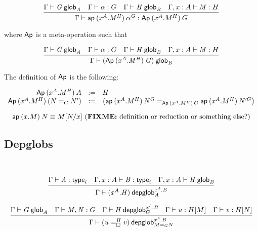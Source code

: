 \begin{small}
  \[\infer{\ofglob{\Gamma}{\ap{(x^A.M^H)}{\alpha^G}}
    {\Ap{(x^A.M^H)}{G}}}
  {\wfglob{\Gamma}{G}{n}{A}
    & \ofglob{\Gamma}{\alpha}{G}
    & \wfglob{\Gamma}{H}{m}{B}
    & \ofglob{\Gamma,x:A}{M}{H}}\]

  where $\dsd{Ap}$ is a meta-operation such that

  \[\infer{\wfglob{\Gamma}{(\Ap{(x^A.M^H)}{G})}{n+m}
    {B}}
  {\wfglob{\Gamma}{G}{n}{A}
    & \ofglob{\Gamma}{\alpha}{G}
    & \wfglob{\Gamma}{H}{m}{B}
    & \ofglob{\Gamma,x:A}{M}{H}}\]

  The definition of $\dsd{Ap}$ is the following:

  \[
  \begin{array}{rcl}
    \Ap{(x^A.M^H)}{A} & := & H \\
    \Ap{(x^A.M^H)}{(\homj{G}{N}{N'})} & := & \left(
      \homj{\Ap{(x^A.M^H)}{G}}
      {\ap{(x^A.M^H)}{N^G}}{\ap{(x^A.M^H)}{N'^G}}\right)
  \end{array}
  \]
\end{small}

\begin{small}
  \[
  \apn{0}{(x.M)}{N}  \equiv  \subst{M}{N}{x}
  \text{ (\FIXME{definition or reduction or something else?})} \\ \\
  \]
\end{small}



\subsection{Depglobs}

\\

\begin{small}
  \[\infer{\wfdepglob{\Gamma}{(x^A.H)}{0,m}{x^A.B}{A}}
  {\wftype{\Gamma}{A}
    & \wftype{\Gamma,x:A}{B}
    & \wfglob{\Gamma,x:A}{H}{m}{B}
  }\]

  \[\infer{\wfdepglob{\Gamma}{(\dhomj{H}{u}{v}{\blank})}{n+1,m}
    {x^A.B}{\homj{G}{M}{N}}} {\wfglob{\Gamma}{G}{n}{A} &
    \ofglob{\Gamma}{M,N}{G}
    & \wfdepglob{\Gamma}{H}{n,m}{x^A.B}{G} & \ofdepglob{\Gamma}{u}{H}{M} &
    \ofdepglob{\Gamma}{v}{H}{N} }\]
\end{small}

